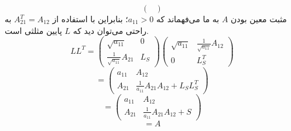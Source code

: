 \begin{itemize}
$$\begin{pmatrix}
	 \end{pmatrix}
	 $$
	 مثبت معین بودن $A$ به ما می‌فهماند که $a_{11} > 0$؛ بنابراین با استفاده از $A_{21}^T = A_{12}$ به راحتی می‌توان دید که $L$ پایین مثلثی است. 
	 $$LL^T = 
	 \begin{pmatrix}
	 \sqrt{a_{11}} & 0 \\
	 \frac{1}{\sqrt{a_{11}}}A_{21} & L_S
	 \end{pmatrix}
	  \begin{pmatrix}
	 \sqrt{a_{11}} & 	 \frac{1}{\sqrt{a_{11}}}A_{12} \\
	 0 & L_S^T
	 \end{pmatrix}
	 $$
	 $$= 
	 \begin{pmatrix}
	 a_{11} & A_{12} \\
	 A_{21} & \frac{1}{a_{11}}A_{21}A_{12} + L_SL_S^T
	 \end{pmatrix}
	 $$
	 $$ = 
	  \begin{pmatrix}
	 a_{11} & A_{12} \\
	 A_{21} & \frac{1}{a_{11}}A_{21}A_{12} + S
	 \end{pmatrix}
	 $$
	 $$ = A$$
\end{itemize}